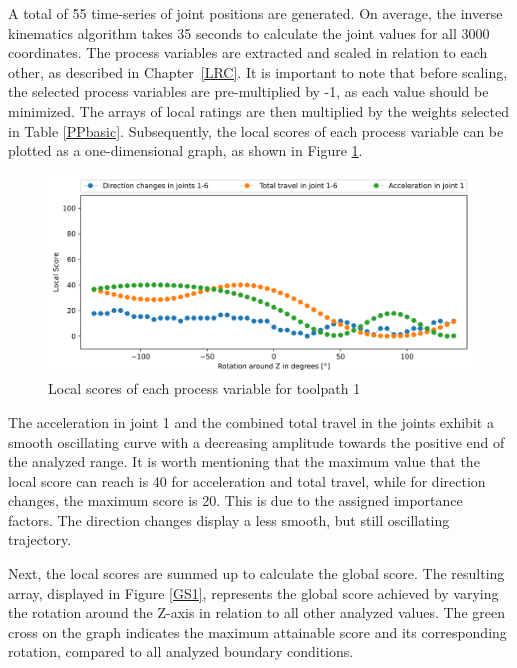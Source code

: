 A total of 55 time-series of joint positions are generated. On average, the inverse kinematics algorithm takes 35 seconds to calculate the joint values for all 3000 coordinates. The process variables are extracted and scaled in relation to each other, as described in Chapter~\ref{LRC}. It is important to note that before scaling, the selected process variables are pre-multiplied by -1, as each value should be minimized. The arrays of local ratings are then multiplied by the weights selected in Table \ref{PPbasic}. Subsequently, the local scores of each process variable can be plotted as a one-dimensional graph, as shown in Figure \ref{LS1}.

\begin{figure}[H]
	\centerline{\includegraphics[width=1\textwidth]{figures/LocalScores_1.png}}
	\caption{Local scores of each process variable for toolpath 1}
	\label{LS1}
\end{figure}
\newpage
The acceleration in joint 1 and the combined total travel in the joints exhibit a smooth oscillating curve with a decreasing amplitude towards the positive end of the analyzed range. It is worth mentioning that the maximum value that the local score can reach is 40 for acceleration and total travel, while for direction changes, the maximum score is 20. This is due to the assigned importance factors. The direction changes display a less smooth, but still oscillating trajectory.

Next, the local scores are summed up to calculate the global score. The resulting array, displayed in Figure \ref{GS1}, represents the global score achieved by varying the rotation around the Z-axis in relation to all other analyzed values. The green cross on the graph indicates the maximum attainable score and its corresponding rotation, compared to all analyzed boundary conditions.

